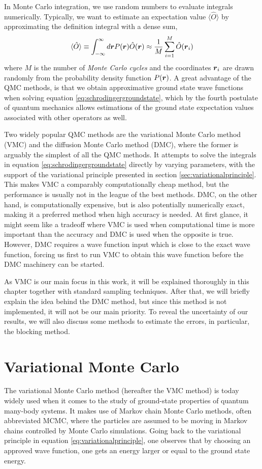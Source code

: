 In Monte Carlo integration, we use random numbers to evaluate integrals numerically. Typically, we want to estimate an expectation value $\langle\hat{O}\rangle$ by approximating the definition integral with a dense sum,
\begin{equation}
\langle \hat{O}\rangle\equiv\int_{-\infty}^{\infty}d\boldsymbol{{r}}P(\boldsymbol{{r}})\hat{O}(\boldsymbol{{r}})\approx\frac{1}{M}\sum_{i=1}^M\hat{O}(\boldsymbol{{r}}_i)
\label{eq:montecarlointegration}
\end{equation}
where $M$ is the number of \textit{Monte Carlo cycles} and the coordinates $\boldsymbol{{r}}_i$ are drawn randomly from the probability density function $P(\boldsymbol{{r}})$. A great advantage of the QMC methods, is that we obtain approximative ground state wave functions when solving equation \eqref{eq:schrodingergroundstate}, which by the fourth postulate of quantum mechanics allows estimations of the ground state expectation values associated with other operators as well. 

Two widely popular QMC methods are the variational Monte Carlo method (VMC) and the diffusion Monte Carlo method (DMC), where the former is arguably the simplest of all the QMC methods. It attempts to solve the integrals in equation \eqref{eq:schrodingergroundstate} directly by varying parameters, with the support of the variational principle presented in section \ref{sec:variationalprinciple}. This makes VMC a comparably computationally cheap method, but the performance is usually not in the league of the best methods. DMC, on the other hand, is computationally expensive, but is also potentially numerically exact, making it a preferred method when high accuracy is needed. At first glance, it might seem like a tradeoff where VMC is used when computational time is more important than the accuracy and DMC is used when the opposite is true. However, DMC requires a wave function input which is close to the exact wave function, forcing us first to run VMC to obtain this wave function before the DMC machinery can be started.

As VMC is our main focus in this work, it will be explained thoroughly in this chapter together with standard sampling techniques. After that, we will briefly explain the idea behind the DMC method, but since this method is not implemented, it will not be our main priority. To reveal the uncertainty of our results, we will also discuss some methods to estimate the errors, in particular, the blocking method.

\section{Variational Monte Carlo} \label{sec:vmc}
The variational Monte Carlo method (hereafter the VMC method) is today widely used when it comes to the study of ground-state properties of quantum many-body systems. It makes use of Markov chain Monte Carlo methods, often abbreviated MCMC, where the particles are assumed to be moving in Markov chains controlled by Monte Carlo simulations. Going back to the variational principle in equation \eqref{eq:variationalprinciple}, one observes that by choosing an approved wave function, one gets an energy larger or equal to the ground state energy.


